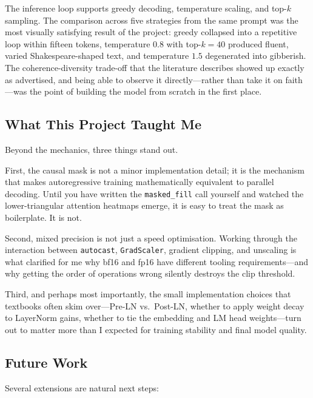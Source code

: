 \noindent The inference loop supports greedy decoding, temperature scaling, and
top-$k$ sampling. The comparison across five strategies from the same
prompt was the most visually satisfying result of the project: greedy
collapsed into a repetitive loop within fifteen tokens, temperature
$0.8$ with top-$k = 40$ produced fluent, varied Shakespeare-shaped
text, and temperature $1.5$ degenerated into gibberish. The
coherence-diversity trade-off that the literature describes
\parencite{holtzman2020curious} showed up exactly as advertised, and
being able to observe it directly---rather than take it on faith---was
the point of building the model from scratch in the first place.

\subsection{What This Project Taught Me}
Beyond the mechanics, three things stand out.

\noindent First, the causal mask is not a minor implementation detail; it is the
mechanism that makes autoregressive training mathematically equivalent
to parallel decoding. Until you have written the
\texttt{masked\_fill} call yourself and watched the lower-triangular
attention heatmaps emerge, it is easy to treat the mask as boilerplate.
It is not.

\noindent Second, mixed precision is not just a speed optimisation. Working
through the interaction between \texttt{autocast}, \texttt{GradScaler},
gradient clipping, and unscaling is what clarified for me why bf16 and
fp16 have different tooling requirements---and why getting the order of
operations wrong silently destroys the clip threshold.

\noindent Third, and perhaps most importantly, the small implementation choices
that textbooks often skim over---Pre-LN vs.\ Post-LN, whether to apply
weight decay to LayerNorm gains, whether to tie the embedding and LM
head weights---turn out to matter more than I expected for training
stability and final model quality.

\subsection{Future Work}
Several extensions are natural next steps:

